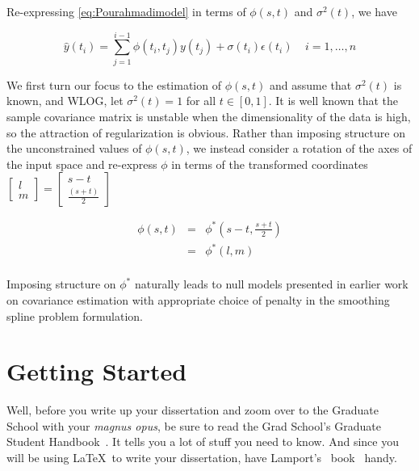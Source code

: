 Re-expressing \eqref{eq:Pourahmadimodel} in terms of $\phi\left(s,t\right)$ and $\sigma^2\left(t\right)$, we have

   \begin{equation}   
   \hat{y}\left(t_i\right)  = \sum_{j=1}^{i-1} \phi\left(t_i ,t_j\right) y\left({t_j}\right) + \sigma\left(t_i\right)\epsilon\left({t_i}\right) \;\;\;\; i=1,\dots, n 
   \label{eq:MyModel} 
   \end{equation}

We first turn our focus to the estimation of $\phi\left(s,t\right)$ and assume that $\sigma^2\left(t\right)$ is known, and WLOG, let $\sigma^2\left(t\right) = 1$ for all $t \in \left[0,1\right]$. It is well known that the sample covariance matrix is unstable when the dimensionality of the data is high, so the attraction of regularization is obvious. Rather than imposing structure on the unconstrained values of $\phi\left(s,t \right)$, we instead consider a rotation of the axes of the input space and re-express $\phi$ in terms of the transformed coordinates $\begin{bmatrix} l\\ m	
\end{bmatrix} = \begin{bmatrix} s - t\\	 \frac{\left(s + t\right)}{2}\end{bmatrix}$

\begin{eqnarray*}
\phi\left(s,t\right) &=& \phi^*\left(s-t,\frac{s+t}{2}\right) \\
 &=& \phi^*\left(l,m\right)\\
\end{eqnarray*}

Imposing structure on $\phi^*$ naturally leads to null models presented in earlier work on covariance estimation with appropriate choice of penalty in the smoothing spline problem formulation. 
    
  
\section{Getting Started}

Well, before you write up your dissertation and zoom over to the
Graduate School with your {\em magnus opus}, be sure to read the Grad
School's Graduate Student Handbook~\cite{osu:guidelines}. It tells you a lot of
stuff you need to know. And since you will be using \LaTeX\ to write
your dissertation, have Lamport's \LaTeXe\ book~\cite{lamport:latex}
handy.

